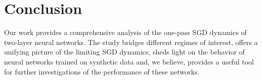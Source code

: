 \section{Conclusion}

\label{2302:sec:conclusion}
Our work provides a comprehensive analysis of the one-pass SGD dynamics of two-layer neural networks. The study bridges different regimes of interest, offers a unifying picture of the limiting SGD dynamics, sheds light on the behavior of neural networks trained on synthetic data and, we believe, provides a useful tool for further investigations of the performance of these networks.
